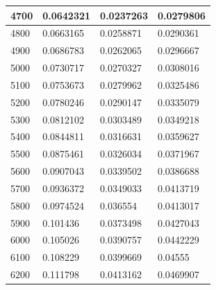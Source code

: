 \documentclass[11pt,spanish]{article} %
\begin{document}
\begin{center}
\begin{longtable}{|l||l|l|l|}
4700                    & 0.0642321                    & 0.0237263                      & 0.0279806                      \\ \hline
4800                    & 0.0663165                    & 0.0258871                      & 0.0290361                      \\ \hline
4900                    & 0.0686783                    & 0.0262065                      & 0.0296667                      \\ \hline
5000                    & 0.0730717                    & 0.0270327                      & 0.0308016                      \\ \hline
5100                    & 0.0753673                    & 0.0279962                      & 0.0325486                      \\ \hline
5200                    & 0.0780246                    & 0.0290147                      & 0.0335079                      \\ \hline
5300                    & 0.0812102                    & 0.0303489                      & 0.0349218                      \\ \hline
5400                    & 0.0844811                    & 0.0316631                      & 0.0359627                      \\ \hline
5500                    & 0.0875461                    & 0.0326034                      & 0.0371967                      \\ \hline
5600                    & 0.0907043                    & 0.0339502                      & 0.0386688                      \\ \hline
5700                    & 0.0936372                    & 0.0349033                      & 0.0413719                      \\ \hline
5800                    & 0.0974524                    & 0.036554                       & 0.0413017                      \\ \hline
5900                    & 0.101436                     & 0.0373498                      & 0.0427043                      \\ \hline
6000                    & 0.105026                     & 0.0390757                      & 0.0442229                      \\ \hline
6100                    & 0.108229                     & 0.0399669                      & 0.04555                        \\ \hline
6200                    & 0.111798                     & 0.0413162                      & 0.0469907                      \\ \hline

\end{longtable}
\end{center}
\end{document}

